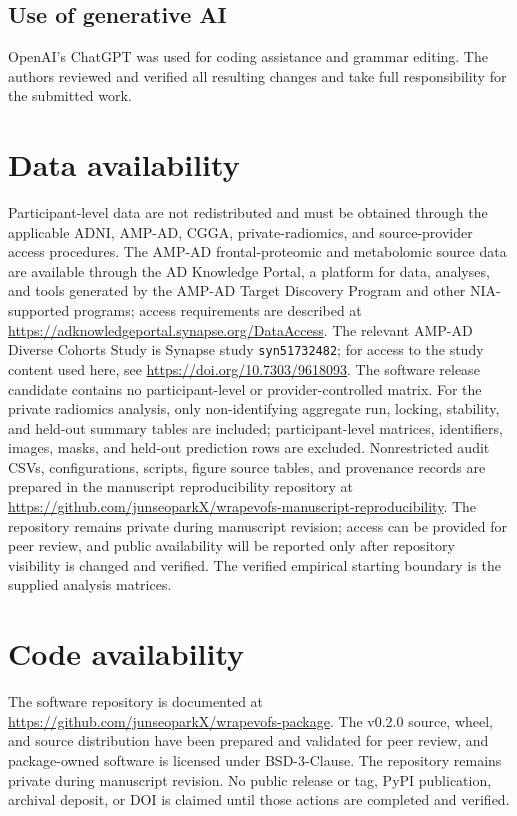\subsection{Use of generative AI}

OpenAI's ChatGPT was used for coding assistance and grammar editing. The authors reviewed and verified all resulting changes and take full responsibility for the submitted work.

\FloatBarrier
\section{Data availability}

Participant-level data are not redistributed and must be obtained through the applicable ADNI, AMP-AD, CGGA, private-radiomics, and source-provider access procedures. The AMP-AD frontal-proteomic and metabolomic source data are available through the AD Knowledge Portal, a platform for data, analyses, and tools generated by the AMP-AD Target Discovery Program and other NIA-supported programs; access requirements are described at \url{https://adknowledgeportal.synapse.org/DataAccess}. The relevant AMP-AD Diverse Cohorts Study is Synapse study \texttt{syn51732482}; for access to the study content used here, see \url{https://doi.org/10.7303/9618093}. The software release candidate contains no participant-level or provider-controlled matrix. For the private radiomics analysis, only non-identifying aggregate run, locking, stability, and held-out summary tables are included; participant-level matrices, identifiers, images, masks, and held-out prediction rows are excluded. Nonrestricted audit CSVs, configurations, scripts, figure source tables, and provenance records are prepared in the manuscript reproducibility repository at \url{https://github.com/junseoparkX/wrapevofs-manuscript-reproducibility}. The repository remains private during manuscript revision; access can be provided for peer review, and public availability will be reported only after repository visibility is changed and verified. The verified empirical starting boundary is the supplied analysis matrices.

\FloatBarrier
\section{Code availability}

The software repository is documented at \url{https://github.com/junseoparkX/wrapevofs-package}. The v0.2.0 source, wheel, and source distribution have been prepared and validated for peer review, and package-owned software is licensed under BSD-3-Clause. The repository remains private during manuscript revision. No public release or tag, PyPI publication, archival deposit, or DOI is claimed until those actions are completed and verified.

